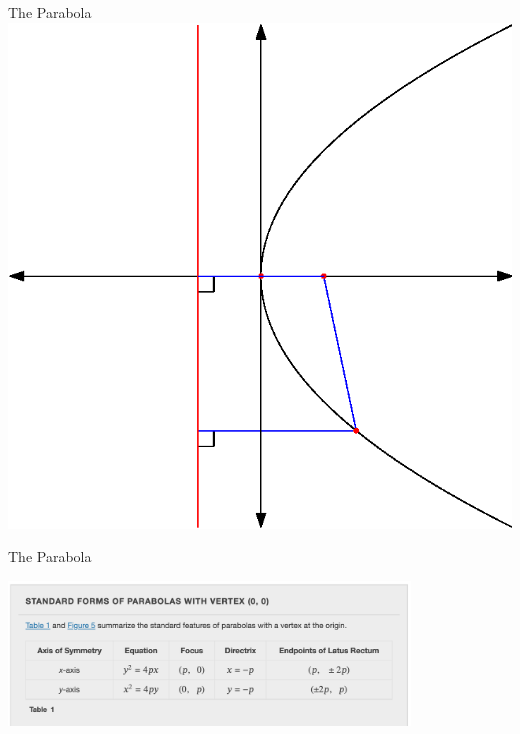 \documentclass[presentation]{beamer}
\begin{document}
\begin{frame}[label={sec:org85b1a05}]{The Parabola}
\includegraphics{./parab_y_orig}
\end{frame}

\begin{frame}[label={sec:org87277ed}]{The Parabola}
\begin{center}
\includegraphics[width=0.8\textwidth]{./parabs_origin}
\end{center}
\end{frame}
\end{document}

